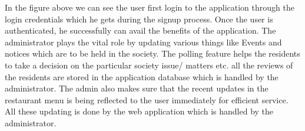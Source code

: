 \vspace{0.2cm}In the figure above we can see the user first login to the application through the login credentials which he gets during the signup process. Once the user is authenticated, he successfully can avail the benefits of the application. The administrator plays the vital role by updating various things like Events and notices which are to be held in the society.
The polling feature helps the residents to take a decision on the particular society issue/ matters etc. all the reviews of the residents are stored in the application database which is handled by the administrator. The admin also makes sure that the recent updates in the restaurant menu is being reflected to the user immediately for efficient service. All these updating is done by the web application which is handled by the administrator.

